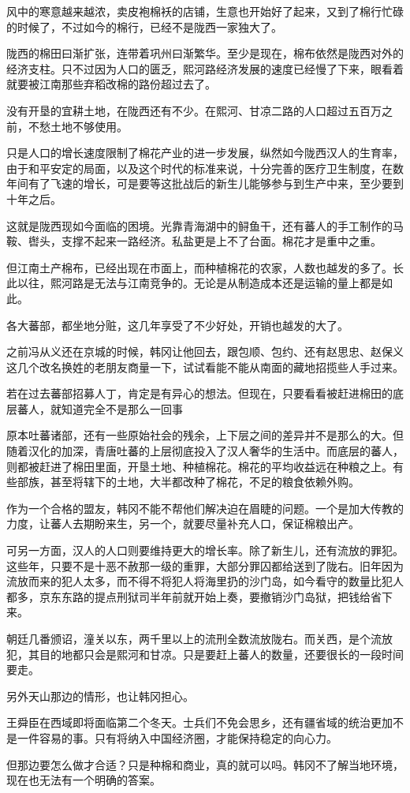 风中的寒意越来越浓，卖皮袍棉袄的店铺，生意也开始好了起来，又到了棉行忙碌的时候了，不过如今的棉行，已经不是陇西一家独大了。

陇西的棉田曰渐扩张，连带着巩州曰渐繁华。至少是现在，棉布依然是陇西对外的经济支柱。只不过因为人口的匮乏，熙河路经济发展的速度已经慢了下来，眼看着就要被江南那些弃稻改棉的路份超过去了。

没有开垦的宜耕土地，在陇西还有不少。在熙河、甘凉二路的人口超过五百万之前，不愁土地不够使用。

只是人口的增长速度限制了棉花产业的进一步发展，纵然如今陇西汉人的生育率，由于和平安定的局面，以及这个时代的标准来说，十分完善的医疗卫生制度，在数年间有了飞速的增长，可是要等这批战后的新生儿能够参与到生产中来，至少要到十年之后。

这就是陇西现如今面临的困境。光靠青海湖中的鲟鱼干，还有蕃人的手工制作的马鞍、辔头，支撑不起来一路经济。私盐更是上不了台面。棉花才是重中之重。

但江南土产棉布，已经出现在市面上，而种植棉花的农家，人数也越发的多了。长此以往，熙河路是无法与江南竞争的。无论是从制造成本还是运输的量上都是如此。

各大蕃部，都坐地分赃，这几年享受了不少好处，开销也越发的大了。

之前冯从义还在京城的时候，韩冈让他回去，跟包顺、包约、还有赵思忠、赵保义这几个改名换姓的老朋友商量一下，试试看能不能从南面的藏地招揽些人手过来。

若在过去蕃部招募人丁，肯定是有异心的想法。但现在，只要看看被赶进棉田的底层蕃人，就知道完全不是那么一回事

原本吐蕃诸部，还有一些原始社会的残余，上下层之间的差异并不是那么的大。但随着汉化的加深，青唐吐蕃的上层彻底投入了汉人奢华的生活中。而底层的蕃人，则都被赶进了棉田里面，开垦土地、种植棉花。棉花的平均收益远在种粮之上。有些部族，甚至将辖下的土地，大半都改种了棉花，不足的粮食依赖外购。

作为一个合格的盟友，韩冈不能不帮他们解决迫在眉睫的问题。一个是加大传教的力度，让蕃人去期盼来生，另一个，就要尽量补充人口，保证棉粮出产。

可另一方面，汉人的人口则要维持更大的增长率。除了新生儿，还有流放的罪犯。这些年，只要不是十恶不赦那一级的重罪，大部分罪囚都给送到了陇右。旧年因为流放而来的犯人太多，而不得不将犯人将海里扔的沙门岛，如今看守的数量比犯人都多，京东东路的提点刑狱司半年前就开始上奏，要撤销沙门岛狱，把钱给省下来。

朝廷几番颁诏，潼关以东，两千里以上的流刑全数流放陇右。而关西，是个流放犯，其目的地都只会是熙河和甘凉。只是要赶上蕃人的数量，还要很长的一段时间要走。

另外天山那边的情形，也让韩冈担心。

王舜臣在西域即将面临第二个冬天。士兵们不免会思乡，还有疆省域的统治更加不是一件容易的事。只有将纳入中国经济圈，才能保持稳定的向心力。

但那边要怎么做才合适？只是种棉和商业，真的就可以吗。韩冈不了解当地环境，现在也无法有一个明确的答案。

